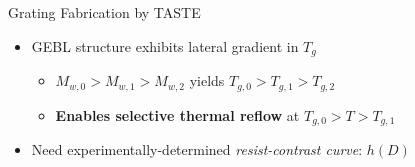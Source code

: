 \documentclass[aspectratio=169,9pt]{beamer}
\begin{document}
\begin{frame}{Grating Fabrication by TASTE}
\begin{minipage}[t]{0.36\linewidth}
\begin{itemize}
\begin{itemize}
  \end{itemize}
  \item GEBL structure exhibits lateral gradient in $T_g$ %
  \begin{itemize}
    \item[$\implies$] $M_{w,0} > M_{w,1} > M_{w,2}$ yields $T_{g,0} > T_{g,1} > T_{g,2}$
    \item[$\implies$] \textbf{Enables selective thermal reflow} at $T_{g,0} > T > T_{g,1}$
  \end{itemize}
  \item Need experimentally-determined \emph{resist-contrast curve}: $h(D)$
 \end{itemize}
  \vspace{2mm}
 \end{minipage}
\end{frame}
\end{document}
